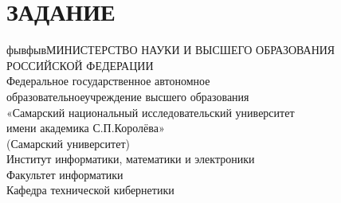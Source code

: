 
    \setcounter{page}{2}






    \section*{ЗАДАНИЕ}{

    \center
    {фывфывМИНИСТЕРСТВО НАУКИ И ВЫСШЕГО ОБРАЗОВАНИЯ РОССИЙСКОЙ ФЕДЕРАЦИИ\\
    {Федеральное государственное автономное  \\[-0.2cm]
    образовательноеучреждение высшего образования\\[-0.2cm]
    «Самарский национальный исследовательский университет \\[-0.2cm]
    имени академика С.П.Королёва»\\[-0.2cm]
    (Самарский университет)}\\[1cm]
    {Институт информатики, математики и электроники}\\[-0.2cm]
    {Факультет информатики}\\[-0.2cm]
    {Кафедра технической кибернетики}\\[1cm]
    }


    }
    \newpage
